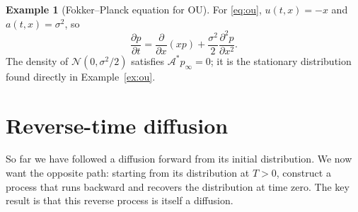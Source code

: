 \documentclass[12pt,a4paper]{report}
\theoremstyle{plain}
\theoremstyle{definition}
\newtheorem{example}{Example}[chapter]
\begin{document}
\begin{example}[Fokker--Planck equation for OU]\label{ex:fp-ou}
For \eqref{eq:ou}, $u(t,x)=-x$ and $a(t,x)=\sigma^2$, so
\[\frac{\partial p}{\partial t}=\frac{\partial}{\partial x}(xp)+\frac{\sigma^2}{2}\frac{\partial^2p}{\partial x^2}.\]
The density of $\mathcal N(0,\sigma^2/2)$ satisfies $\mathcal A^*p_\infty=0$; it is the stationary distribution found directly in Example~\ref{ex:ou}.
\end{example}

\chapter{Reverse-time diffusion}\label{chap:reverse}
So far we have followed a diffusion forward from its initial distribution. We now want the opposite path: starting from its distribution at $T>0$, construct a process that runs backward and recovers the distribution at time zero. The key result is that this reverse process is itself a diffusion.
\end{document}
